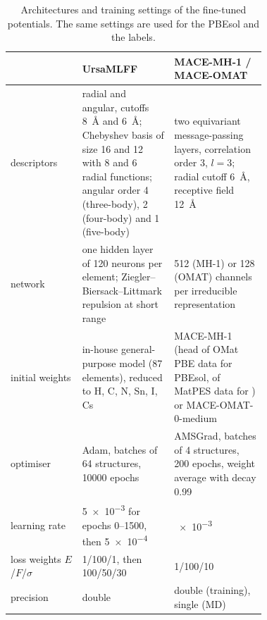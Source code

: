 \begin{table}[htbp]
  \centering\small
  \caption{Architectures and training settings of the fine-tuned potentials. The same settings are
    used for the PBEsol and the \rSCAN{} labels.}
  \label{tab:si-hyper}
  \begin{tabular}{lp{0.36\linewidth}p{0.36\linewidth}}
    \toprule
    & UrsaMLFF & MACE-MH-1 / MACE-OMAT \\
    \midrule
    descriptors & radial and angular, cutoffs \SI{8}{\angstrom} and \SI{6}{\angstrom}; Chebyshev basis of
      size 16 and 12 with 8 and 6 radial functions; angular order 4 (three-body), 2 (four-body) and 1
      (five-body) & two equivariant message-passing layers, correlation order 3, $l = 3$; radial cutoff
      \SI{6}{\angstrom}, receptive field \SI{12}{\angstrom} \\
    network & one hidden layer of 120 neurons per element; Ziegler--Biersack--Littmark repulsion at short
      range & 512 (MH-1) or 128 (OMAT) channels per irreducible representation \\
    initial weights & in-house general-purpose model (87 elements), reduced to H, C, N, Sn, I, Cs &
      MACE-MH-1 (head of OMat PBE data for PBEsol, of MatPES \rSCAN{} data for \rSCAN{}) or
      MACE-OMAT-0-medium \\
    optimiser & Adam, batches of 64 structures, \num{10000} epochs & AMSGrad, batches of 4 structures,
      200 epochs, weight average with decay 0.99 \\
    learning rate & \num{5e-3} for epochs 0--1500, then \num{5e-4} & \num{e-3} \\
    loss weights $E$/$F$/$\sigma$ & 1/100/1, then 100/50/30 & 1/100/10 \\
    precision & double & double (training), single (MD) \\
    \bottomrule
  \end{tabular}
\end{table}





